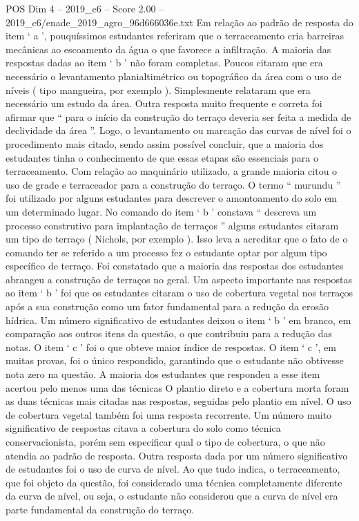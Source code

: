 \begin{textsample}{POS Dim 4 – 2019\_c6 – Score 2.00 – 2019\_c6/enade\_2019\_agro\_96d666036e.txt}
Em relação ao padrão de resposta do item ‘ a ’, pouquíssimos estudantes referiram que o terraceamento cria barreiras mecânicas ao escoamento da água o que favorece a infiltração.
A maioria das respostas dadas ao item ‘ b ’ não foram completas.
Poucos citaram que era necessário o levantamento planialtimétrico ou topográfico da área com o uso de níveis ( tipo mangueira, por exemplo ).
Simplesmente relataram que era necessário um estudo da área.
Outra resposta muito frequente e correta foi afirmar que “ para o início da construção do terraço deveria ser feita a medida de declividade da área ”.
Logo, o levantamento ou marcação das curvas de nível foi o procedimento mais citado, sendo assim possível concluir, que a maioria dos estudantes tinha o conhecimento de que essas etapas são essenciais para o terraceamento.
Com relação ao maquinário utilizado, a grande maioria citou o uso de grade e terraceador para a construção do terraço.
O termo “ murundu ” foi utilizado por alguns estudantes para descrever o amontoamento do solo em um determinado lugar.
No comando do item ‘ b ’ constava “ descreva um processo construtivo para implantação de terraços ” alguns estudantes citaram um tipo de terraço ( Nichols, por exemplo ).
Isso leva a acreditar que o fato de o comando ter se referido a um processo fez o estudante optar por algum tipo específico de terraço.
Foi constatado que a maioria das respostas dos estudantes abrangeu a construção de terraços no geral.
Um aspecto importante nas respostas ao item ‘ b ’ foi que os estudantes citaram o uso de cobertura vegetal nos terraços após a sua construção como um fator fundamental para a redução da erosão hídrica.
Um número significativo de estudantes deixou o item ‘ b ’ em branco, em comparação aos outros itens da questão, o que contribuiu para a redução das notas.
O item ‘ c ’ foi o que obteve maior índice de respostas.
O item ‘ c ’, em muitas provas, foi o único respondido, garantindo que o estudante não obtivesse nota zero na questão.
A maioria dos estudantes que respondeu a esse item acertou pelo menos uma das técnicas O plantio direto e a cobertura morta foram as duas técnicas mais citadas nas respostas, seguidas pelo plantio em nível.
O uso de cobertura vegetal também foi uma resposta recorrente.
Um número muito significativo de respostas citava a cobertura do solo como técnica conservacionista, porém sem especificar qual o tipo de cobertura, o que não atendia ao padrão de resposta.
Outra resposta dada por um número significativo de estudantes foi o uso de curva de nível.
Ao que tudo indica, o terraceamento, que foi objeto da questão, foi considerado uma técnica completamente diferente da curva de nível, ou seja, o estudante não considerou que a curva de nível era parte fundamental da construção do terraço.

\end{textsample}
